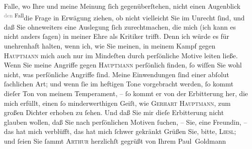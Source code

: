                Falle, wo Ihre und meine Meinung ſich gegenüberſtehen, nicht einen Augenblick \substVorne{}\textsuperscript{\textcolor{gray}{den} Fall}\substDazwischen{}die Frage\substHinten{} in Erwägung ziehen, ob nicht vielleicht Sie im Unrecht ſind, und daß Sie
               ohneweiters eine Auslegung ſich zurechtmachen, die mich (ich kann es nicht anders
               ſagen) in meiner  Ehre als Kritiker trifft. Denn ich würde es für
               unehrenhaft halten, wenn ich, wie Sie meinen, in meinem Kampf gegen \textsc{Hauptmann} mich auch nur im Mindeſten durch perſönliche Motive leiten ließe. Wenn Sie
               meine Angriffe gegen \textsc{Hauptmann} perſönlich {\pb}finden, ſo wiſſen Sie wohl nicht,
               was perſönliche Angriffe ſind. Meine Einwendungen ſind einer abſolut ſachlichen Art;
               und wenn ſie im heftigen Tone vorgebracht werden, ſo kommt dieſer Ton von meinem
               Temperament, – ſo kommt er von der Erbitterung her, die mich erfüllt, einen ſo
               minderwerthigen Geiſt, wie \textsc{Gerhart Hauptmann}, zum großen Dichter erhoben zu ſehen. Und daß Sie mir dieſe Erbitterung nicht
               glauben wollen, daß Sie nach perſönlichen Motiven ſuchen, – Sie, eine Freundin, – das
               hat mich verblüfft, das hat mich ſchwer gekränkt{\dotsfive}\pend
           \pstart Grüßen Sie, bitte, \textsc{Liesl}; und ſeien Sie ſammt \textsc{Arthur} herzlichſt gegrüßt von Ihrem \spacefill\mbox{Paul Goldmann}\pend{}\endnumbering{}  
      
